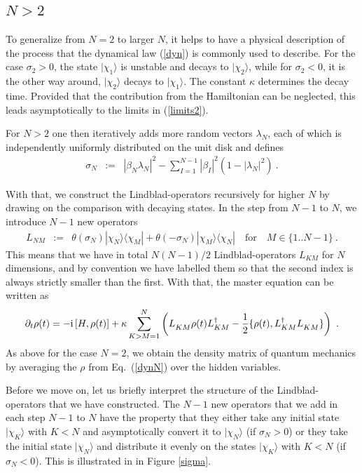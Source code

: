 \documentclass[11pt,twoside,A4]{article}
\def\beqn{\begin{eqnarray}}
\def\eeqn{\end{eqnarray}}
\begin{document}
 \subsection{$N>2$}

To generalize from $N=2$ to larger $N$, it helps to have a physical description of the process that the dynamical law (\ref{dyn}) is commonly used to describe. For the case $\sigma_2 > 0$, the state $|\chi_1\rangle$ is unstable and decays to $|\chi_2\rangle$, while for $\sigma_2 < 0$, it is the other way around,  $|\chi_2 \rangle$ decays to $|\chi_1 \rangle$. The constant $\kappa$ determines the decay time. Provided that the contribution from the Hamiltonian can be neglected, this leads asymptotically to the limits in (\ref{limits2}). 

For $N>2$ one then iteratively adds more random vectors $\lambda_N$, each of which is independently uniformly distributed on the unit disk and defines  
\beqn
\sigma_N &:=& | \beta_N  \lambda_N |^2 - \sum_{I=1}^{N-1} |\beta_I|^2 (1 - |\lambda_N|^2 ) ~.
\eeqn


With that, we construct the Lindblad-operators recursively for higher $N$ by drawing on the comparison with decaying states. In the step from $N-1$ to $N$, we introduce $N-1$ new operators 
\beqn
L_{NM} &:=&    \theta(\sigma_N)   |\chi_N \rangle \langle \chi_M| + 
 \theta(-\sigma_N)  |\chi_M \rangle \langle \chi_N| \quad \mbox{for} \quad M \in \{1.. N-1\}~. \label{lnk}
\eeqn
This means that we have in total $N(N-1)/2$ Lindblad-operators $L_{KM}$ for $N$ dimensions, and by convention we have labelled them so that the second index is always strictly smaller than the first. With that, the master equation can be written as
\beqn
\partial_t \rho(t) = - {\rm i} \left[  H, \rho(t) \right] +  
\kappa \sum_{K>M=1}^N  \left( L^{\textcolor{white}{\dag}}_{KM} \rho(t) L_{KM}^\dag - \frac{1}{2} \{ \rho(t), L^\dag_{KM} L_{KM}^{\textcolor{white}{\dag}} \} \right)~. \label{dynN}
\eeqn
As above for the case $N=2$, we obtain the density matrix of quantum mechanics by averaging the $\rho$ from Eq.\ (\ref{dynN}) over the hidden variables.

Before we move on, let us briefly interpret the structure of the Lindblad-operators that we have constructed. The $N-1$ new operators that we add in each step $N-1$ to $N$ have the property that they either take any initial state $| \chi_K\rangle$ with $K<N$ and asymptotically convert it to $|\chi_N\rangle$ (if $\sigma_N > 0$) or they take the initial state $|\chi_N \rangle$ and distribute it evenly on the states $|\chi_K\rangle$ with $K < N$ (if $\sigma_N < 0$). This is illustrated in in Figure \ref{sigma}.
\end{document}
